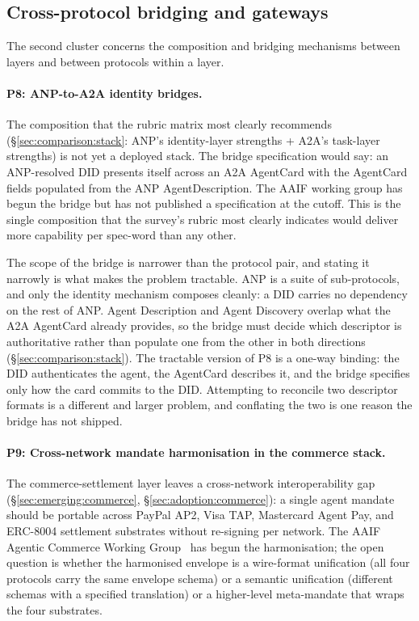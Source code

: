 \subsection{Cross-protocol bridging and gateways}
\label{sec:openproblems:bridging}

The second cluster concerns the composition and bridging
mechanisms between layers and between protocols within a
layer.

\paragraph{P8: ANP-to-A2A identity bridges.}
The composition that the rubric matrix most clearly
recommends (\S\ref{sec:comparison:stack}: ANP's
identity-layer strengths + A2A's task-layer strengths)
is not yet a deployed stack. The bridge specification
would say: an ANP-resolved DID presents itself across
an A2A AgentCard with the AgentCard fields populated
from the ANP AgentDescription. The AAIF working group
has begun the bridge but has not published a
specification at the cutoff. This is the single
composition that the survey's rubric most clearly
indicates would deliver more capability per spec-word
than any other.

The scope of the bridge is narrower than the protocol pair,
and stating it narrowly is what makes the problem
tractable. ANP is a suite of sub-protocols, and only the
identity mechanism composes cleanly: a DID carries no
dependency on the rest of ANP. Agent Description and Agent
Discovery overlap what the A2A AgentCard already provides,
so the bridge must decide which descriptor is
authoritative rather than populate one from the other in
both directions (\S\ref{sec:comparison:stack}). The
tractable version of P8 is a one-way binding: the DID
authenticates the agent, the AgentCard describes it, and
the bridge specifies only how the card commits to the DID.
Attempting to reconcile two descriptor formats is a
different and larger problem, and conflating the two is
one reason the bridge has not shipped.

\paragraph{P9: Cross-network mandate harmonisation in
the commerce stack.}
The commerce-settlement layer leaves a cross-network
interoperability gap (\S\ref{sec:emerging:commerce},
\S\ref{sec:adoption:commerce}): a single agent
mandate should be portable across PayPal AP2, Visa
TAP, Mastercard Agent Pay, and ERC-8004 settlement
substrates without re-signing per network. The AAIF
Agentic Commerce Working Group~\cite{lf_aaif} has
begun the harmonisation; the open question is whether
the harmonised envelope is a wire-format unification
(all four protocols carry the same envelope schema)
or a semantic unification (different schemas with a
specified translation) or a higher-level meta-mandate
that wraps the four substrates.

